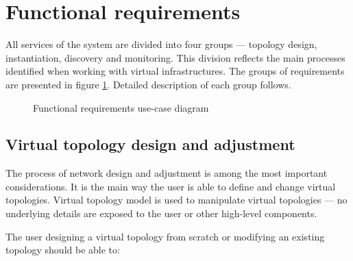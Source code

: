 \documentclass[11pt,openany]{book}
\begin{document}
    \section{Functional requirements}
    \label{sec:req:func}

      All services of the system are divided into four groups --- topology design, instantiation, discovery and
      monitoring. This division reflects the main processes identified when working with virtual infrastructures. The
      groups of requirements are presented in figure \ref{fig:req:uc}. Detailed description of each group follows.

      \begin{figure}[h]
          \centering


          \caption{Functional requirements use-case diagram}
          \label{fig:req:uc}
        \end{figure}


      \subsection{Virtual topology design and adjustment}

        The process of network design and adjustment is among the most important considerations. It is the main
        way the user is able to define and change virtual topologies. Virtual topology model is used to manipulate
        virtual topologies --- no underlying details are exposed to the user or other high-level components.

        The user designing a virtual topology from scratch or modifying an existing topology should be able to:
\end{document}
